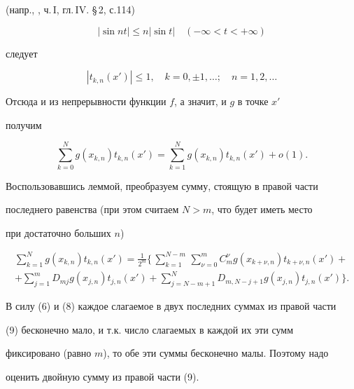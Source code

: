 \begin{pf}
(напр., \cite{Nat}, ч.\,I, гл.\,IV. \S\,2, с.114)


$$


|\sin nt|\le n|\sin t|\quad (-\infty<t<+\infty)


$$


следует


\begin{equation}


|t_{k,n}(x')|\le 1,\quad k=0,\pm 1,\dotsc;\quad


n=1,2,\dotsc


\end{equation}


Отсюда и из непрерывности функции $f$, а значит, и $g$ в точке $x'$


получим


$$


\sum^N_{k=0}g(x_{k,n})t_{k,n}(x')=


\sum^N_{k=1}g(x_{k,n})t_{k,n}(x')+o(1).


$$


Воспользовавшись леммой, преобразуем сумму, стоящую в правой части


последнего равенства (при этом считаем $N>m$, что будет иметь место


при достаточно больших $n$)


\begin{multline}


\sum^N_{k=1}g(x_{k,n})t_{k,n}(x')=\frac{1}{2^m}\biggl\{\,


\sum^{N-m}_{k=1}\,\sum^m_{\nu=0}C^\nu_mg(x_{k+\nu,n})t_{k+\nu,n}


(x')+\\


+\sum^m_{j=1}D_{mj}g(x_{j,n})t_{j,n}(x')+\sum^N_{j=N-m+1}


D_{m,N-j+1}g(x_{j,n})t_{j,n}(x')\biggr\}.


\end{multline}





В силу (6) и (8) каждое слагаемое в двух последних суммах из правой части


(9) бесконечно мало, и т.к. число слагаемых в каждой их эти сумм


фиксировано (равно $m$), то обе эти суммы бесконечно малы. Поэтому надо


оценить двойную сумму из правой части (9).






\end{pf}
